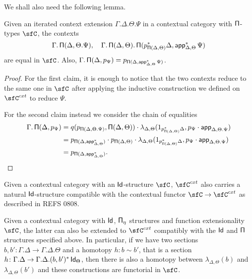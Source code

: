 We shall also need the following lemma.

\begin{lem}\label{piequal}
  Given an iterated context extension $\Gamma.\Delta.\Theta.\Psi$ in a
  contextual category with $\operatorname{\mathsf{\Pi}}$-types $\sfC$, the contexts
  \[\Gamma.\operatorname{\mathsf{\Pi}}(\Delta,\Theta.\Psi),\quad\Gamma.\operatorname{\mathsf{\Pi}}(\Delta,\Theta).\operatorname{\mathsf{\Pi}}(p^*_{\operatorname{\mathsf{\Pi}}(\Delta,\Theta)}\Delta,\operatorname{\mathsf{app}}^*_{\Delta,\Theta}\Psi)\]
  are equal in $\sfC$. Also,
  $\Gamma.\operatorname{\mathsf{\Pi}}(\Delta,p_{\Psi})=p_{\operatorname{\mathsf{\Pi}}(\Delta,\operatorname{\mathsf{app}}^*_{\Delta,\Theta}\Psi)}$.
\end{lem}
\begin{proof}
  For the first claim, it is enough to notice that the two contexts reduce to
  the same one in $\sfC$ after applying the inductive construction we defined on
  $\sfC^{cxt}$ to reduce $\Psi$.

  For the second claim instead we consider the chain of equalities
  \begin{align*}
    \Gamma.\operatorname{\mathsf{\Pi}}(\Delta,p_{\Psi})
    &=q(p_{\operatorname{\mathsf{\Pi}}(\Delta,\Theta.\Psi)},\operatorname{\mathsf{\Pi}}(\Delta,\Theta))\cdot
    \lambda_{\Delta,\Theta}(1_{p^*_{\operatorname{\mathsf{\Pi}}(\Delta,\Theta)}\Delta},p_\Psi\cdot\operatorname{\mathsf{app}}_{\Delta,\Theta.\Psi}) \\
    &=p_{\operatorname{\mathsf{\Pi}}(\Delta,\operatorname{\mathsf{app}}^*_{\Delta,\Theta})}\cdot
    p_{\operatorname{\mathsf{\Pi}}(\Delta,\Theta)}\cdot
    \lambda_{\Delta,\Theta}(1_{p^*_{\operatorname{\mathsf{\Pi}}(\Delta,\Theta)}\Delta},p_\Psi\cdot\operatorname{\mathsf{app}}_{\Delta,\Theta.\Psi}) \\
    &=p_{\operatorname{\mathsf{\Pi}}(\Delta,\operatorname{\mathsf{app}}^*_{\Delta,\Theta})}.
  \end{align*}
\end{proof}


\begin{prop}\cite[Prop.\ 3.3.1]{Gar09b}
  Given a contextual category with an $\operatorname{\mathsf{Id}}$-structure $\sfC$, $\sfC^{cxt}$ also
  carries a natural $\operatorname{\mathsf{Id}}$-structure compatible with the contextual functor
  $\sfC\rightarrow\sfC^{cxt}$ as described in REFS 0808.
\end{prop}

\begin{lem}\cite[Lemma 2.28]{1808}
  Given a contextual category with $\operatorname{\mathsf{Id}}$, $\operatorname{\mathsf{\Pi}_\eta}$ structures and function
  extensionality $\sfC$, the latter can also be extended to $\sfC^{cxt}$
  compatibly with the $\operatorname{\mathsf{Id}}$ and $\operatorname{\mathsf{\Pi}}$ structures specified above. In particular,
  if we have two sections
  $b,b'\colon\Gamma.\Delta\rightarrow\Gamma.\Delta.\Theta$ and a homotopy
  $h:b\sim b'$, that is a section
  $h\colon\Gamma.\Delta\rightarrow\Gamma.\Delta.(b,b')^*\operatorname{\mathsf{Id}}_{\Theta}$,
  then there is also a homotopy between $\lambda_{\Delta,\Theta}(b)$ and
  $\lambda_{\Delta,\Theta}(b')$ and these constructions are functorial in $\sfC$.
\end{lem}

